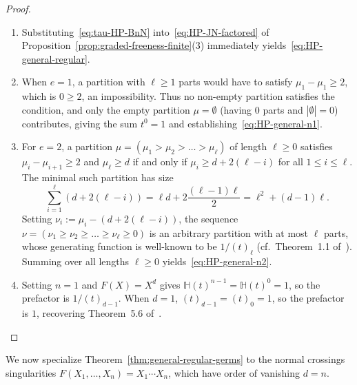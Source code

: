 \documentclass[a4paper, 12pt]{amsart}
\theoremstyle{remark}
\begin{document}
\begin{proof}
\begin{enumerate}
  \item Substituting~\eqref{eq:tau-HP-BnN} into~\eqref{eq:HP-JN-factored} of Proposition~\ref{prop:graded-freeness-finite}(3) immediately yields~\eqref{eq:HP-general-regular}.
  \item When $e = 1$,
  a partition with $\ell \ge 1$ parts would have to satisfy $\mu_1 - \mu_1 \ge 2$,
  which is $0 \ge 2$,
  an impossibility.
  Thus no non-empty partition satisfies the condition,
  and only the empty partition $\mu = \emptyset$ (having $0$ parts and $|\emptyset| = 0$) contributes,
  giving the sum $t^0 = 1$ and establishing~\eqref{eq:HP-general-n1}.
  \item For $e = 2$,
  a partition $\mu = (\mu_1 > \mu_2 > \dots > \mu_\ell)$ of length $\ell \ge 0$ satisfies $\mu_i - \mu_{i + 1} \ge 2$ and $\mu_\ell \ge d$ if and only if $\mu_i \ge d + 2(\ell - i)$ for all $1 \le i \le \ell$.
  The minimal such partition has size
  \begin{equation*}
    \sum_{i = 1}^\ell \left(d + 2(\ell - i)\right) = \ell d + 2 \frac{(\ell - 1)\ell}{2} = \ell^2 + (d - 1)\ell.
  \end{equation*}
  Setting $\nu_i := \mu_i - \left(d + 2(\ell - i)\right)$,
  the sequence $\nu = (\nu_1 \ge \nu_2 \ge \dots \ge \nu_\ell \ge 0)$ is an arbitrary partition with at most $\ell$ parts,
  whose generating function is well-known to be $1 / (t)_\ell$ (cf.\ Theorem~1.1 of~\cite{andrews_partitions_1976}).
  Summing over all lengths $\ell \ge 0$ yields~\eqref{eq:HP-general-n2}.
  \item Setting $n = 1$ and $F(X) = X^d$ gives $\mathbb{H}(t)^{n - 1} = \mathbb{H}(t)^0 = 1$,
  so the prefactor is $1 / (t)_{d - 1}$.
  When $d = 1$,
  $(t)_{d - 1} = (t)_0 = 1$,
  so the prefactor is $1$,
  recovering Theorem~5.6 of~\cite{bruschek_arc_2013}.
\end{enumerate}
\end{proof}

We now specialize Theorem~\ref{thm:general-regular-germs} to the normal crossings singularities $F(X_1, \dots, X_n) = X_1 \cdots X_n$,
which have order of vanishing $d = n$.
\end{document}
